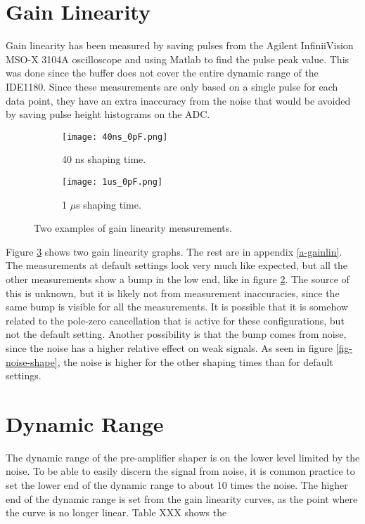 \documentclass[../main/thesis.tex]{subfiles}
\begin{document}



\section{Gain Linearity}
\label{ide-linearity}

Gain linearity has been measured by saving pulses from the Agilent InfiniiVision MSO-X 3104A oscilloscope and using Matlab to find the pulse peak value. This was done since the buffer does not cover the entire dynamic range of the IDE1180. Since these measurements are only based on a single pulse for each data point, they have an extra inaccuracy from the noise that would be avoided by saving pulse height histograms on the ADC. 

\begin{figure} %
	\centering
	\begin{subfigure}{.5\textwidth}
		\centering
		\texttt{[image: 40ns\_0pF.png]}
		\caption{40 ns shaping time.}
		\label{fig-gainlin-40n}
	\end{subfigure}%
	\begin{subfigure}{.5\textwidth}
		\centering
		\texttt{[image: 1us\_0pF.png]}
		\caption{1 $\mu$s shaping time.}
		\label{fig-gainlin-1u} 
	\end{subfigure}
	\caption{Two examples of gain linearity measurements.}
	\label{fig-gainlin}
\end{figure}

Figure \ref{fig-gainlin} shows two gain linearity graphs. The rest are in appendix \ref{a-gainlin}. The measurements at default settings look very much like expected, but all the other measurements show a bump in the low end, like in figure \ref{fig-gainlin-1u}. The source of this is unknown, but it is likely not from measurement inaccuracies, since the same bump is visible for all the measurements. It is possible that it is somehow related to the pole-zero cancellation that is active for these configurations, but not the default setting. Another possibility is that the bump comes from noise, since the noise has a higher relative effect on weak signals. As seen in figure \ref{fig-noise-shape}, the noise is higher for the other shaping times than for default settings. 

\section{Dynamic Range}
\label{ide-dynamicrange}
The dynamic range of the pre-amplifier shaper is on the lower level limited by the noise. To be able to easily discern the signal from noise, it is common practice to set the lower end of the dynamic range to about 10 times the noise. The higher end of the dynamic range is set from the gain linearity curves, as the point where the curve is no longer linear. Table XXX shows the 
\end{document}
